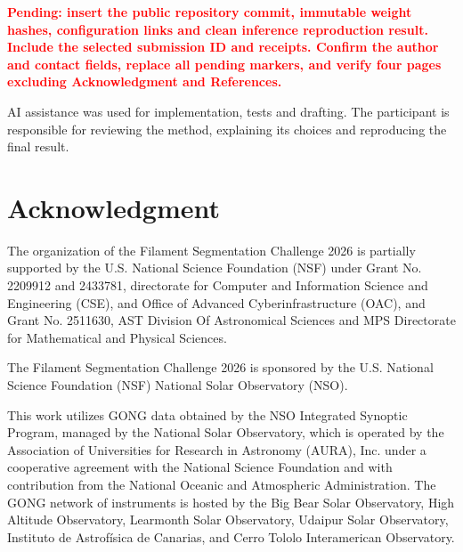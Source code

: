 \documentclass[sigconf]{acmart}
\newcommand{\pending}[1]{\textcolor{red}{\textbf{Pending: #1}}}
\begin{document}
\pending{insert the public repository commit, immutable weight hashes, configuration links and clean inference reproduction result. Include the selected submission ID and receipts. Confirm the author and contact fields, replace all pending markers, and verify four pages excluding Acknowledgment and References.}

AI assistance was used for implementation, tests and drafting. The participant is responsible for reviewing the method, explaining its choices and reproducing the final result.

\section{Acknowledgment}\label{sec:acknowledgment}
    The organization of the Filament Segmentation Challenge 2026 is partially supported by the U.S. National Science Foundation (NSF) under Grant No. 2209912 and 2433781, directorate for Computer and Information Science and Engineering (CSE), and Office of Advanced Cyberinfrastructure (OAC), and Grant No. 2511630, AST Division Of Astronomical Sciences and MPS Directorate for Mathematical and Physical Sciences.

    The Filament Segmentation Challenge 2026 is sponsored by the U.S. National Science Foundation (NSF) National Solar Observatory (NSO).

    This work utilizes GONG data obtained by the NSO Integrated Synoptic Program, managed by the National Solar Observatory, which is operated by the Association of Universities for Research in Astronomy (AURA), Inc. under a cooperative agreement with the National Science Foundation and with contribution from the National Oceanic and Atmospheric Administration. The GONG network of instruments is hosted by the Big Bear Solar Observatory, High Altitude Observatory, Learmonth Solar Observatory, Udaipur Solar Observatory, Instituto de Astrofísica de Canarias, and Cerro Tololo Interamerican Observatory.




\end{document}
